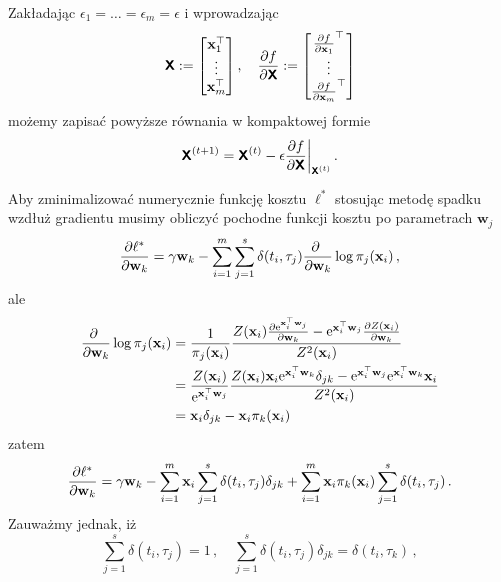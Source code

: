\documentclass{myclass}
\begin{document}
Zakładając \(\epsilon_1 = \ldots = \epsilon_m = \epsilon\) i wprowadzając
\begin{equation*}
    \oper{X} := \mqty[\mathbf{x}_1^\top \\ \vdots \\ \mathbf{x}_m^\top]\,,\quad \pdv{f}{\oper{X}} := \mqty[\pdv{f}{\mathbf{x}_1}^\top \\ \vdots \\ \pdv{f}{\mathbf{x}_m}^\top]
\end{equation*}
możemy zapisać powyższe równania w kompaktowej formie
\begin{equation*}
    \boldsymbol{\mathsf{X}}^{(t+1)} = \boldsymbol{\mathsf{X}}^{(t)} - \epsilon \pdv{f}{\boldsymbol{\mathsf{X}}}\bigg|_{\boldsymbol{\mathsf{X}}^{(t)}}\,.
\end{equation*}

Aby zminimalizować numerycznie funkcję kosztu \(\ell^*\) stosując metodę spadku wzdłuż gradientu
musimy obliczyć pochodne funkcji kosztu po parametrach \(\mathbf{w}_j\)
\begin{equation*}
    \pdv{\ell^*}{\mathbf{w}_k} = \gamma\mathbf{w}_k - \sum_{i=1}^m\sum_{j=1}^s \delta(t_i,\tau_j)\pdv{~}{\mathbf{w}_k}\log\pi_j(\mathbf{x}_i)\,,
\end{equation*}
ale
\begin{equation*}
    \begin{split}
        \pdv{~}{\mathbf{w}_k}\log\pi_j(\mathbf{x}_i) &= \frac{1}{\pi_j(\mathbf{x}_i)}\frac{Z(\mathbf{x}_i)\pdv{\mathrm{e}^{\mathbf{x}_i^\top\mathbf{w}_j}}{\mathbf{w}_k} - \mathrm{e}^{\mathbf{x}_i^\top\mathbf{w}_j}\pdv{Z(\mathbf{x}_i)}{\mathbf{w}_k}}{Z^2(\mathbf{x}_i)}\\
        &= \frac{Z(\mathbf{x}_i)}{\mathrm{e}^{\mathbf{x}_i^\top\mathbf{w}_j}}\frac{Z(\mathbf{x}_i)\mathbf{x}_i\mathrm{e}^{\mathbf{x}_i^\top\mathbf{w}_k}\delta_{jk} - \mathrm{e}^{\mathbf{x}_i^\top\mathbf{w}_j}\mathrm{e}^{\mathbf{x}_i^\top\mathbf{w}_k}\mathbf{x}_i}{Z^2(\mathbf{x}_i)}\\
        &= \mathbf{x}_i\delta_{jk} - \mathbf{x}_i\pi_k(\mathbf{x}_i)
    \end{split}
\end{equation*}
zatem
\begin{equation*}
    \pdv{\ell^*}{\mathbf{w}_k} = \gamma\mathbf{w}_k - \sum_{i=1}^m\mathbf{x}_i\sum_{j=1}^s \delta(t_i, \tau_j)\delta_{jk} + \sum_{i=1}^m\mathbf{x}_i\pi_k(\mathbf{x}_i)\sum_{j=1}^s\delta(t_i, \tau_j)\,.
\end{equation*}
Zauważmy jednak, iż
\begin{equation*}
    \sum_{j=1}^s\delta(t_i, \tau_j) = 1\,,\quad \sum_{j=1}^s \delta(t_i, \tau_j)\delta_{jk} = \delta(t_i, \tau_k)\,,
\end{equation*}
\end{document}
